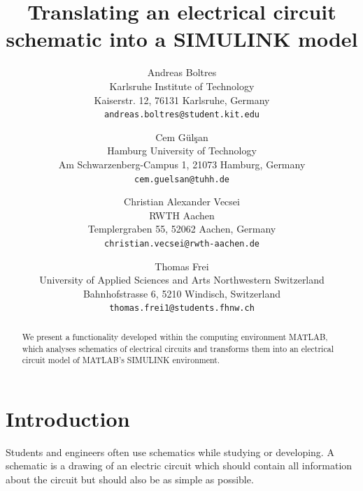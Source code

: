\documentclass[10pt,twocolumn,letterpaper]{article}
\begin{document}
\title{Translating an electrical circuit schematic into a SIMULINK model}

\author{Andreas Boltres\\
Karlsruhe Institute of Technology\\
Kaiserstr. 12, 76131 Karlsruhe, Germany\\
{\tt\small andreas.boltres@student.kit.edu}
\and
Cem G\"ul\c{s}an\\
Hamburg University of Technology\\
Am Schwarzenberg-Campus 1, 21073 Hamburg, Germany\\
{\tt\small cem.guelsan@tuhh.de}
\and
Christian Alexander Vecsei\\
RWTH Aachen\\
Templergraben 55, 52062 Aachen, Germany\\
{\tt\small christian.vecsei@rwth-aachen.de}
\and
Thomas Frei\\
University of Applied Sciences and Arts Northwestern Switzerland\\
Bahnhofstrasse 6, 5210 Windisch, Switzerland\\
{\tt\small thomas.frei1@students.fhnw.ch}
}

\maketitle

\begin{abstract}
We present a functionality developed within the computing environment MATLAB, which analyses schematics of electrical circuits and transforms them into an electrical circuit model of MATLAB's SIMULINK environment.
\end{abstract}

\section{Introduction}

Students and engineers often use schematics while studying or developing. A schematic is a drawing of an electric circuit which should contain all information about the circuit but should also be as simple as possible.
\end{document}
